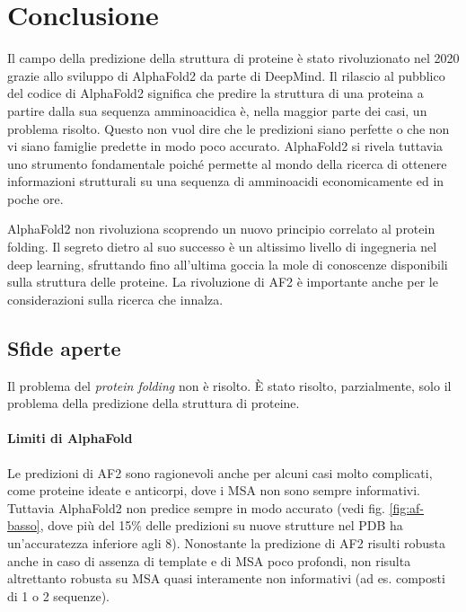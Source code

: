 \chapter{Conclusione}

Il campo della predizione della struttura di proteine è stato rivoluzionato nel 2020 grazie allo sviluppo di AlphaFold2 da parte di DeepMind. Il rilascio al pubblico del codice di AlphaFold2 significa che predire la struttura di una proteina a partire dalla sua sequenza amminoacidica è, nella maggior parte dei casi, un problema risolto. Questo non vuol dire che le predizioni siano perfette o che non vi siano famiglie predette in modo poco accurato. AlphaFold2 si rivela tuttavia uno strumento fondamentale poiché permette al mondo della ricerca di ottenere informazioni strutturali su una sequenza di amminoacidi economicamente ed in poche ore.

\par AlphaFold2 non rivoluziona scoprendo un nuovo principio correlato al protein folding. Il segreto dietro al suo successo è un altissimo livello di ingegneria nel deep learning, sfruttando fino all'ultima goccia la mole di conoscenze disponibili sulla struttura delle proteine. La rivoluzione di AF2 è importante anche per le considerazioni sulla ricerca che innalza.

\section{Sfide aperte}

Il problema del \textit{protein folding} non è risolto. È stato risolto, parzialmente, solo il problema della predizione della struttura di proteine.

\subsubsection{Limiti di AlphaFold}
Le predizioni di AF2 sono ragionevoli anche per alcuni casi molto complicati, come proteine ideate e anticorpi, dove i MSA non sono sempre informativi. Tuttavia AlphaFold2 non predice sempre in modo accurato (vedi fig. \ref{fig:af-basso}, dove più del 15\% delle predizioni su nuove strutture nel PDB ha un'accuratezza inferiore agli 8\angstrom). Nonostante la predizione di AF2 risulti robusta anche in caso di assenza di template e di MSA poco profondi, non risulta altrettanto robusta su MSA quasi interamente non informativi (ad es. composti di 1 o 2 sequenze). 

